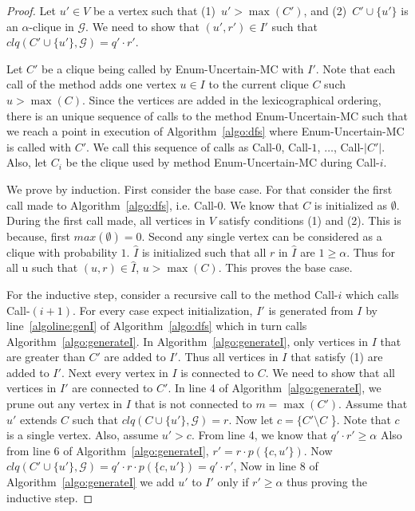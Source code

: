 \documentclass[11pt,letterpaper]{article}
\newcommand{\ugraph}{\mathcal{G}}
\newcommand{\cliqueprob}{clq}
\begin{document}
\begin{proof}
Let $u' \in V$ be a vertex such that
(1)~$u' > \max(C')$, and
(2)~$C' \cup \{ u' \}$ is an $\alpha$-clique in $\ugraph$.
We need to show that $(u',r') \in I'$ such that
$\cliqueprob(C' \cup \{ u' \},\ugraph) = q' \cdot r'$.

Let $C'$ be a clique being called by Enum-Uncertain-MC with $I'$. 
Note that each call of the method adds one vertex $u \in I$ to the current clique $C$ 
such $u > \max(C)$. Since the vertices are added in the lexicographical ordering,
there is an unique sequence of calls to the method Enum-Uncertain-MC
such that we reach a point in execution of Algorithm~\ref{algo:dfs} where
Enum-Uncertain-MC is called with $C'$. We call this sequence of calls as
Call-$0$, Call-$1$, $\ldots$, Call-$\left | C' \right |$. 
Also, let $C_i$ be the clique used by method Enum-Uncertain-MC during Call-$i$.

We prove by induction. First consider the base case. For that
consider the first call made to Algorithm~\ref{algo:dfs}, i.e. Call-$0$.
We know that $C$ is initialized as $\emptyset$. 
During the first call made, all vertices in $V$ satisfy conditions (1) and (2). 
This is because, first $max(\emptyset) = 0$. 
Second any single vertex can be considered as a clique with probability $1$.
$\hat{I}$ is initialized such that all $r$ in $\hat{I}$ are $1 \ge \alpha$.
Thus for all u such that $(u,r) \in \hat{I}$, $u > \max(C)$.
This proves the base case.

For the inductive step, consider a recursive call to the method 
Call-$i$ which calls Call-$(i+1)$.
For every case expect initialization, $I'$ is generated from $I$ by 
line~\ref{algoline:genI} of Algorithm~\ref{algo:dfs} which in turn
calls Algorithm~\ref{algo:generateI}. In Algorithm~\ref{algo:generateI},
only vertices in $I$ that are greater than $C'$ are added to $I'$.
Thus all vertices in $I$ that satisfy (1) are added to $I'$.
Next every vertex in $I$ is connected to $C$. We need to show that all vertices
in $I'$ are connected to $C'$. 
In line 4 of Algorithm~\ref{algo:generateI}, we prune out any vertex in $I$
that is not connected to $m = \max(C')$.
Assume that $u'$ extends $C$ such that
$\cliqueprob(C \cup \{ u' \},\ugraph) = r$. Now let $c = \{ C' \setminus C$ \}.
Note that $c$ is a single vertex. Also, assume $u' > c$. 
From line 4, we know that $q' \cdot r' \ge \alpha$
Also from line 6 of Algorithm~\ref{algo:generateI}, $r' = r \cdot p(\{c,u'\})$.
Now $\cliqueprob(C' \cup \{ u' \},\ugraph) = q' \cdot r \cdot p(\{c,u'\}) = q' \cdot r'$,
Now in line 8 of Algorithm~\ref{algo:generateI} we add $u'$ to $I'$ only if $r' \ge \alpha$
thus proving the inductive step. 
\end{proof}
\end{document}
